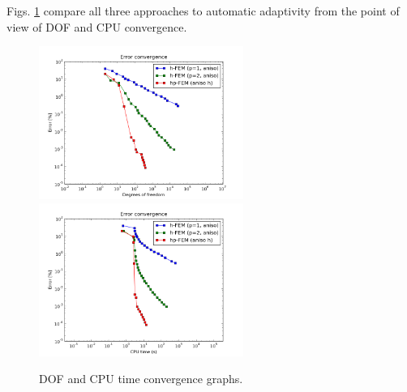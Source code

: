 Figs. \ref{fig:nist-10-conv} compare all
three approaches to automatic adaptivity from the point
of view of DOF and CPU convergence.

\begin{figure}[!ht]
\centering
\includegraphics[height=5cm]{nist/nist-10/conv_dof_aniso.png}\ \
\includegraphics[height=5cm]{nist/nist-10/conv_cpu_aniso.png}
\caption{DOF and CPU time convergence graphs.}
\label{fig:nist-10-conv}
\end{figure}

